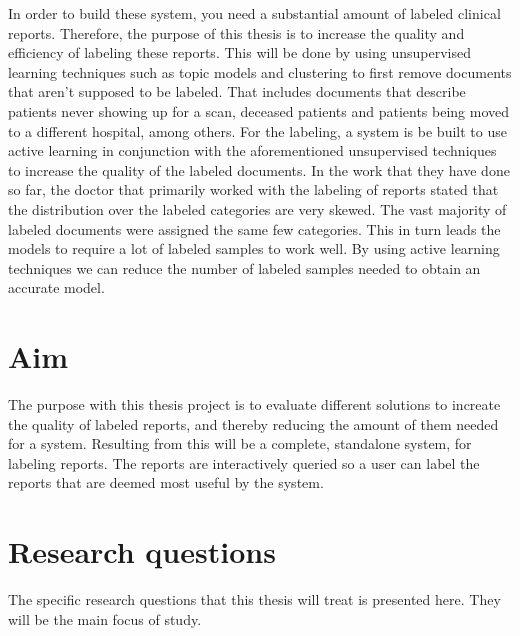 In order to build these system, you need a substantial amount of labeled clinical reports.
Therefore, the purpose of this thesis is to increase the quality and efficiency of labeling these reports.
This will be done by using unsupervised learning techniques such as topic models and clustering to first remove documents that aren't supposed to be labeled.
That includes documents that describe patients never showing up for a scan, deceased patients and patients being moved to a different hospital, among others.
For the labeling, a system is be built to use active learning in conjunction with the aforementioned unsupervised techniques to increase the quality of the labeled documents.
In the work that they have done so far, the doctor that primarily worked with the labeling of reports stated that the distribution over the labeled categories are very skewed.
The vast majority of labeled documents were assigned the same few categories.
This in turn leads the models to require a lot of labeled samples to work well.
By using active learning techniques we can reduce the number of labeled samples needed to obtain an accurate model.

\section{Aim}
\label{sec:aim}

The purpose with this thesis project is to evaluate different solutions to increate the quality of labeled reports, and thereby reducing the amount of them needed for a system.
Resulting from this will be a complete, standalone system, for labeling reports.
The reports are interactively queried so a user can label the reports that are deemed most useful by the system.


\section{Research questions}
\label{sec:research-questions}

The specific research questions that this thesis will treat is presented here.
They will be the main focus of study.

